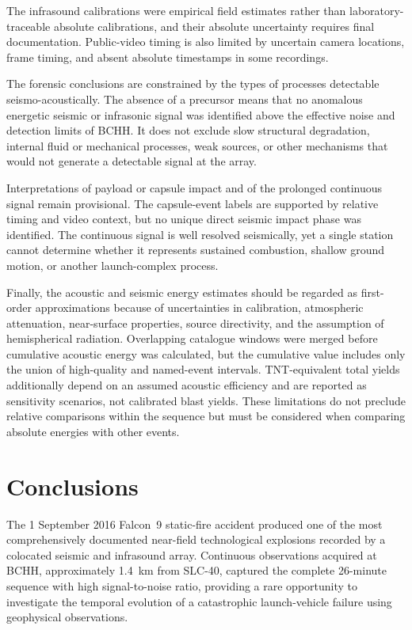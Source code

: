 \documentclass[]{seismica}
\begin{document}
The infrasound calibrations were empirical field estimates rather than
laboratory-traceable absolute calibrations, and their absolute uncertainty
requires final documentation. Public-video timing is also limited by uncertain
camera locations, frame timing, and absent absolute timestamps in some
recordings.

The forensic conclusions are constrained by the types of processes detectable
seismo-acoustically. The absence of a precursor means that no anomalous
energetic seismic or infrasonic signal was identified above the effective noise
and detection limits of BCHH. It does not exclude slow structural degradation,
internal fluid or mechanical processes, weak sources, or other mechanisms that
would not generate a detectable signal at the array.

Interpretations of payload or capsule impact and of the prolonged continuous
signal remain provisional. The capsule-event labels are supported by relative
timing and video context, but no unique direct seismic impact phase was
identified. The continuous signal is well resolved seismically, yet a single
station cannot determine whether it represents sustained combustion, shallow
ground motion, or another launch-complex process.

Finally, the acoustic and seismic energy estimates should be regarded as
first-order approximations because of uncertainties in calibration,
atmospheric attenuation, near-surface properties, source directivity, and the
assumption of hemispherical radiation. Overlapping catalogue windows were
merged before cumulative acoustic energy was calculated, but the cumulative
value includes only the union of high-quality and named-event intervals.
TNT-equivalent total yields additionally depend on an assumed acoustic
efficiency and are reported as sensitivity scenarios, not calibrated blast
yields. These limitations do not preclude relative comparisons within the
sequence but must be considered when comparing absolute energies with other
events.

\section{Conclusions}
\label{sec:conclusions}

The 1 September 2016 Falcon~9 static-fire accident produced one of the most comprehensively documented near-field technological explosions recorded by a colocated seismic and infrasound array. Continuous observations acquired at BCHH, approximately 1.4~km from SLC-40, captured the complete 26-minute sequence with high signal-to-noise ratio, providing a rare opportunity to investigate the temporal evolution of a catastrophic launch-vehicle failure using geophysical observations.
\end{document}
